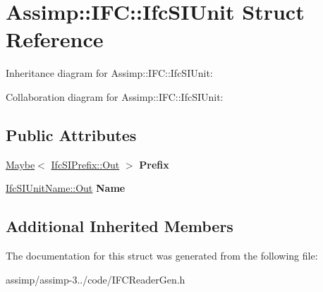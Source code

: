 \hypertarget{struct_assimp_1_1_i_f_c_1_1_ifc_s_i_unit}{\section{Assimp\+:\+:I\+F\+C\+:\+:Ifc\+S\+I\+Unit Struct Reference}
\label{struct_assimp_1_1_i_f_c_1_1_ifc_s_i_unit}
}


Inheritance diagram for Assimp\+:\+:I\+F\+C\+:\+:Ifc\+S\+I\+Unit\+:


Collaboration diagram for Assimp\+:\+:I\+F\+C\+:\+:Ifc\+S\+I\+Unit\+:
\subsection*{Public Attributes}
\begin{DoxyCompactItemize}
\item 
\hypertarget{struct_assimp_1_1_i_f_c_1_1_ifc_s_i_unit_a711129fdf8338b67296ebebcfd232891}{\hyperlink{struct_assimp_1_1_s_t_e_p_1_1_maybe}{Maybe}$<$ \hyperlink{classboost_1_1shared__ptr}{Ifc\+S\+I\+Prefix\+::\+Out} $>$ {\bfseries Prefix}}\label{struct_assimp_1_1_i_f_c_1_1_ifc_s_i_unit_a711129fdf8338b67296ebebcfd232891}

\item 
\hypertarget{struct_assimp_1_1_i_f_c_1_1_ifc_s_i_unit_acf1d0a693ddc614a2a7ece3383d8d9ca}{\hyperlink{classboost_1_1shared__ptr}{Ifc\+S\+I\+Unit\+Name\+::\+Out} {\bfseries Name}}\label{struct_assimp_1_1_i_f_c_1_1_ifc_s_i_unit_acf1d0a693ddc614a2a7ece3383d8d9ca}

\end{DoxyCompactItemize}
\subsection*{Additional Inherited Members}


The documentation for this struct was generated from the following file\+:\begin{DoxyCompactItemize}
\item 
assimp/assimp-\/3../code/I\+F\+C\+Reader\+Gen.\+h\end{DoxyCompactItemize}
